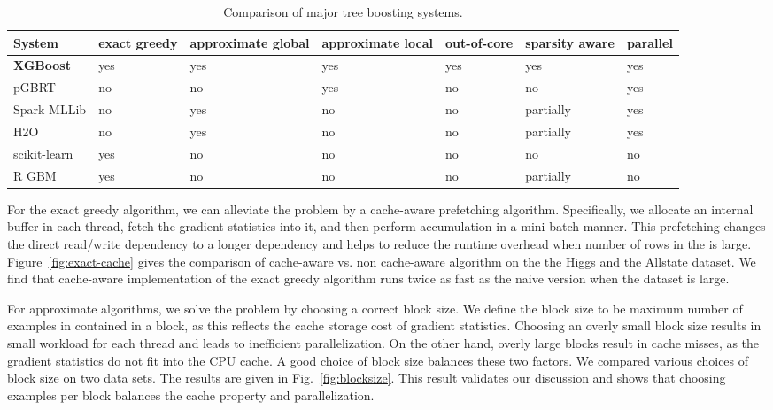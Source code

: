 \documentclass{sig-alternate-05-2015}
\begin{document}
\begin{table*}
\centering
\caption{Comparison of major tree boosting systems.}\label{tbl:system-cmp}
\begin{tabular}{|l|m{1cm}|m{1.7cm}|m{1.7cm}|m{1.7cm}|m{1.7cm}|m{1.7cm}|}\hline
  System & exact greedy & approximate global & approximate local & out-of-core &sparsity aware& parallel \\ \hline
  \textbf{XGBoost} & yes & yes  & yes &yes &yes & yes\\\hline
  pGBRT & no & no & yes & no & no & yes\\\hline
  Spark MLLib & no & yes  & no  & no & partially & yes\\\hline
  H2O & no &  yes  & no   & no & partially & yes\\\hline
  scikit-learn & yes  & no  & no & no & no & no\\ \hline
  R GBM & yes & no & no & no& partially &no\\\hline
\end{tabular}
\end{table*}

For the exact greedy algorithm, we can alleviate the problem by a cache-aware prefetching algorithm.
Specifically, we allocate an internal buffer in each thread, fetch the gradient statistics into it, and then perform accumulation in a mini-batch manner.
This prefetching changes the direct read/write dependency to a longer dependency and helps to reduce the runtime overhead when number of rows in the is large.
Figure~\ref{fig:exact-cache} gives the comparison of cache-aware vs. non cache-aware algorithm on the the Higgs and the Allstate dataset.
We find that cache-aware implementation of the exact greedy algorithm runs twice as fast as the naive version when the dataset is large.

For approximate algorithms, we solve the problem by choosing a correct block size. We define the block size to be maximum number of examples in contained in a block, as this reflects the cache storage cost of gradient statistics.
Choosing an overly small block size results in small workload for each thread and leads to inefficient parallelization. On the other hand, overly large blocks result in cache misses, as the gradient statistics do not fit into the CPU cache.
A good choice of block size balances these two factors.
We compared various choices of block size on two data sets.
The results are given in Fig.~\ref{fig:blocksize}.
This result validates our discussion and shows that choosing  examples per block balances the cache property and parallelization.
\end{document}
